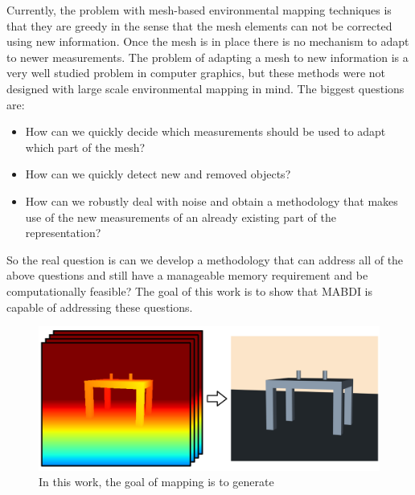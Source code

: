 Currently, the problem with mesh-based environmental mapping techniques is
that they are greedy in the sense that the mesh elements can not be
corrected using new information. Once the mesh is in place there is no
mechanism to adapt to newer measurements. The problem of adapting a mesh to
new information is a very well studied problem in computer graphics, but
these methods were not designed with large scale environmental mapping in
mind. The biggest questions are:

\begin{itemize}
\item How can we quickly decide which measurements should be used to adapt
which part of the mesh?
\item How can we quickly detect new and removed objects?
\item How can we robustly deal with noise and obtain a methodology that makes use of the new
measurements of an already existing part of the representation?
\end{itemize}

So the real question is can we develop a methodology that can address all
of the above questions and still have a manageable memory requirement and
be computationally feasible? The goal of this work is to show that MABDI is
capable of addressing these questions.

\begin{figure}[thpb]
\centering
\includegraphics[width=.5\textwidth]{figures/diagram_goal.png}
\caption{In this work, the goal of mapping is to generate  }
\label{fig:goal}
\end{figure}

